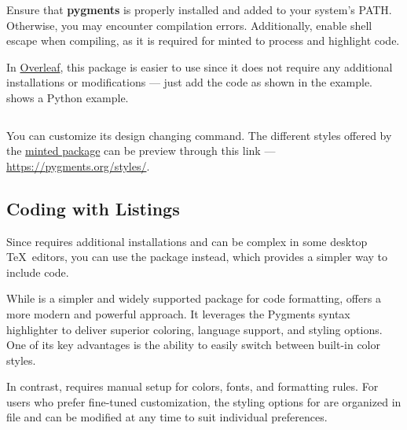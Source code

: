 \documentclass[9pt,a4paper,twocolumn,twoside]{rho-class/rho}
\begin{document}
		\vspace*{-9pt}
        
		\begin{rhoenv}[frametitle=Caution]
			Ensure that \textbf{pygments} is properly installed and added to your system’s PATH. Otherwise, you may encounter compilation errors. Additionally, enable shell escape when compiling, as it is required for minted to process and highlight code.
		\end{rhoenv}
		
		In \href{https://es.overleaf.com/}{Overleaf}, this package is easier to use since it does not require any additional installations or modifications — just add the code as shown in the example.  shows a Python example.
		
		\begin{code}
			\inputminted{python}{example.py}
            \caption{Python code example with minted.}
			\label{lst:example}
		\end{code}
		
		You can customize its design changing \inlinecode{\usemintedstyle} command. The different styles offered by the \href{https://ctan.org/pkg/minted}{minted package} can be preview through this link — \url{https://pygments.org/styles/}.

    \subsection{Coding with Listings}
	
		Since  requires additional installations and can be complex in some desktop \TeX\ editors, you can use the  package instead, which provides a simpler way to include code.
		
		\begin{code}
			
			\label{lst:example2}
            \caption{Python code example with listings.}
		\end{code}
		
		While  is a simpler and widely supported package for code formatting,  offers a more modern and powerful approach. It leverages the Pygments syntax highlighter to deliver superior coloring, language support, and styling options. One of its key advantages is the ability to easily switch between built-in color styles.
		
		In contrast,  requires manual setup for colors, fonts, and formatting rules.
		For users who prefer fine-tuned customization, the styling options for  are organized in  file and can be modified at any time to suit individual preferences.
\end{document}
